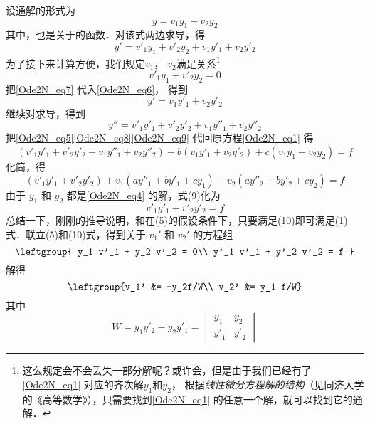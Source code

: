 设通解的形式为
\begin{equation}\label{Ode2N_eq5}
y = v_1 y_1 + v_2 y_2
\end{equation}
其中，也是关于的函数．对该式两边求导，得
\begin{equation}\label{Ode2N_eq6}
y' = v'_1 y_1 + v'_2 y_2 + v_1 y'_1 + v_2 y'_2
\end{equation}
为了接下来计算方便，我们规定$v_1$，  $v_2$满足关系\footnote{这么规定会不会丢失一部分解呢？或许会，但是由于我们已经有了\autoref{Ode2N_eq1} 对应的齐次解$y_1$和$y_2$， 根据\emph{线性微分方程解的结构}（见同济大学的《高等数学》），只需要找到\autoref{Ode2N_eq1} 的任意一个解，就可以找到它的通解．}
\begin{equation}\label{Ode2N_eq7}
v'_1 y_1 + v'_2 y_2 = 0
\end{equation}
把\autoref{Ode2N_eq7} 代入\autoref{Ode2N_eq6}， 得到
\begin{equation}\label{Ode2N_eq8}
y' = v_1 y'_1 + v_2 y'_2
\end{equation}
继续对求导，得到
\begin{equation}\label{Ode2N_eq9}
y'' = {v'_1}{y'_1} + {v'_2}{y'_2} + {v_1}{y''_1} + {v_2}{y''_2}
\end{equation}
把\autoref{Ode2N_eq5}\autoref{Ode2N_eq8}\autoref{Ode2N_eq9} 代回原方程\autoref{Ode2N_eq1} 得
\begin{equation}
(v'_1 y'_1 + v'_2 y'_2 + v_1 y''_1 + v_2 y''_2) + b (v_1 y'_1 + v_2 y'_2) + c(v_1 y_1 + v_2 y_2) = f
\end{equation}
化简，得
\begin{equation}
(v'_1 y'_1 + v'_2 y'_2) + v_1 (a y''_1 + b y'_1 + c y_1) + v_2 (a y''_2 + b y'_2 + c y_2) = f \end{equation}
由于 $y_1$ 和 $y_2$ 都是\autoref{Ode2N_eq4} 的解，式(9)化为 %
\begin{equation} {v'_1}{y'_1} + {v'_2}{y'_2} = f
\end{equation}
总结一下，刚刚的推导说明，和在(5)的假设条件下，只要满足(10)即可满足(1)式．联立(5)和(10)式，得到关于 $v_1'$ 和 $v_2'$ 的方程组
\begin{equation}
\leftgroup{
y_1 v'_1 + y_2 v'_2 = 0\\
y'_1 v'_1 + y'_2 v'_2 = f
}\end{equation}
解得
\begin{equation}
\leftgroup{v_1' &= -y_2f/W\\
v_2' &= y_1 f/W}
\end{equation}
其中
\begin{equation}
W = {y_1}{y'_2} - {y_2}{y'_1} = 
\begin{vmatrix}
{{y_1}}&{{y_2}}\\
{{{y'}_1}}&{{{y'}_2}}
\end{vmatrix}
\end{equation}

